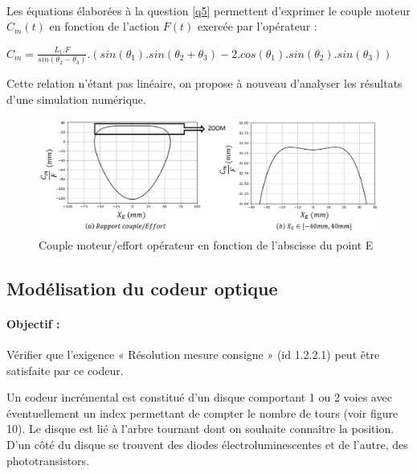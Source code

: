 ~\

Les équations élaborées à la question \ref{q5} permettent d'exprimer le couple moteur $C_m(t)$ en
fonction de l'action $F(t)$ exercée par l'opérateur :

\begin{center}
$C_m=\frac{L_1.F}{sin(\theta_2-\theta_3)}.(sin(\theta_1).sin(\theta_2+\theta_3)-2.cos(\theta_1).sin(\theta_2).sin(\theta_3))$
\end{center}

Cette relation n'étant pas linéaire, on propose à nouveau d'analyser les résultats d'une simulation numérique.

\begin{figure}[ht!]
\begin{center}
 \includegraphics[width=0.9\linewidth]{img/Figure9b}
\end{center}
\caption{Couple moteur/effort opérateur en fonction de l'abscisse du point E}
\label{fig9b}
\end{figure}


\subsection{Modélisation du codeur optique}

\paragraph{Objectif :} Vérifier que l'exigence « Résolution mesure consigne » (id 1.2.2.1) peut être satisfaite par ce codeur.

Un codeur incrémental est constitué d'un disque comportant 1 ou 2 voies avec éventuellement un index permettant de compter le nombre de tours (voir figure 10). Le disque est lié à
l'arbre tournant dont on souhaite connaître la position. D'un côté du disque se trouvent des
diodes électroluminescentes et de l'autre, des phototransistors.

